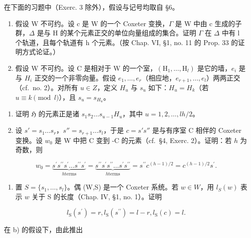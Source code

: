 
在下面的习题中（Exerc. 3 除外），假设与记号均取自 §6。

\begin{enumerate}
\def\labelenumi{\arabic{enumi})}
\item
  假设 W 不可约。设 c 是 W 的一个 Coxeter 变换，\(\Gamma\) 是 W 中由 c 生成的子群，\(\Delta\) 是与 H 的某个元素正交的单位向量组成的集合。证明 \(\Gamma\) 在 \(\Delta\) 中有 l 个轨道，且每个轨道有 h 个元素。（按 Chap. VI, §1, no. 11 的 Prop. 33 的证明方式论证。）
\item
  假设 W 不可约。设 C 是相对于 W 的一个室，\((\mathrm{H}_{1},\ldots,\mathrm{H}_{l})\) 是它的墙，\(e_{i}\) 是与 \(H_{i}\) 正交的一个非零向量。假设 \(e_{1},\ldots,e_{r}\)（相应地，\(e_{r+1},\ldots,e_{l}\)）两两正交（cf.~no. 2）。对所有 \(u\in Z\)，定义 \(H_{u}\) 与 \(s_{u}\) 如下：\(H_{u}=H_{k}\)（若 \(u\equiv k\pmod{l}\)），且 \(s_{u}=s_{H_{u}}\)。
\end{enumerate}

\begin{enumerate}
\def\labelenumi{\alph{enumi})}
\item
  证明 \(\mathfrak{H}\) 的元素正是诸 \(s_1 s_2 \ldots s_{u-1} H_u\)，其中 \(u = 1, 2, \ldots, lh/2\)。
\item
  设 \(s' = s_1 \ldots s_r\)，\(s'' = s_{r+1} \ldots s_l\)，于是 \(c = s's''\) 是与有序室 C 相伴的 Coxeter 变换。设 \(w_0\) 是 W 中把 C 变到 -C 的元素（cf.~§4, Exerc. 2）。证明：若 \(h\) 为奇数，则
\end{enumerate}

\[
w _ {0} = \underbrace {s ^ {\prime} s ^ {\prime \prime} s ^ {\prime} \ldots s ^ {\prime \prime} s ^ {\prime}} _ {h \text {terms}} = \underbrace {s ^ {\prime \prime} s ^ {\prime} s ^ {\prime \prime} \ldots s ^ {\prime} s ^ {\prime \prime}} _ {h \text {terms}} = s ^ {\prime \prime} c ^ {(h - 1) / 2} = c ^ {(h - 1) / 2} s ^ {\prime}.
\]

\begin{enumerate}
\def\labelenumi{\alph{enumi})}
\setcounter{enumi}{2}
\tightlist
\item
  置 \(S = \{s_1, \ldots, s_l\}\)。偶 (W,S) 是一个 Coxeter 系统。若 \(w \in W\)，用 \(l_S(w)\) 表示 \(w\) 关于 S 的长度（Chap. IV, §1, no. 1）。证明
\end{enumerate}

\[
l _ {\mathrm{S}} (s ^ {\prime}) = r, l _ {\mathrm{S}} (s ^ {\prime \prime}) = l - r, l _ {\mathrm{S}} (c) = l.
\]

在 b) 的假设下，由此推出

